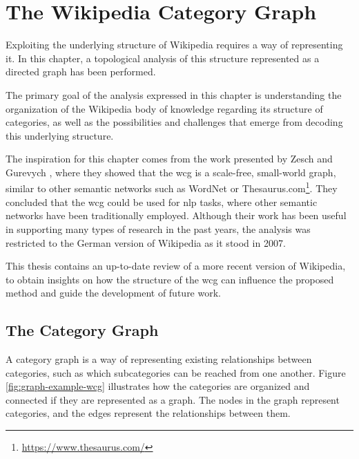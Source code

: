 \chapter{\hspace*{3pt} The Wikipedia Category Graph}
\label{chapter:graph}

Exploiting the underlying structure of Wikipedia requires a way of representing it.  In this chapter, a topological analysis of this structure represented as a directed graph has been performed.

The primary goal of the analysis expressed in this chapter is understanding the organization of the Wikipedia body of knowledge regarding its structure of categories, as well as the possibilities and challenges that emerge from decoding this underlying structure. 

The inspiration for this chapter comes from the work presented by Zesch and Gurevych \cite{zesch2007analysis}, where they showed that the \gls{wcg} is a scale-free, small-world graph, similar to other semantic networks such as WordNet \cite{miller1998wordnet} or Thesaurus.com\footnote{\url{https://www.thesaurus.com/}}. They concluded that the \gls{wcg} could be used for \gls{nlp} tasks, where other semantic networks have been traditionally employed. Although their work has been useful in supporting many types of research in the past years, the analysis was restricted to the German version of Wikipedia as it stood in 2007. 

This thesis contains an up-to-date review of a more recent version of Wikipedia, to obtain insights on how the structure of the \gls{wcg} can influence the proposed method and guide the development of future work. 

\section{\hspace*{3pt} The Category Graph}


A category graph is a way of representing existing relationships between categories, such as which subcategories can be reached from one another. Figure \ref{fig:graph-example-wcg} illustrates how the categories are organized and connected if they are represented as a graph. The nodes in the graph represent categories, and the edges represent the relationships between them. 

